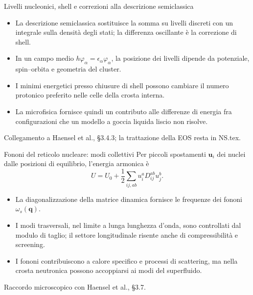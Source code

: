 \begin{frame}[t]{Livelli nucleonici, shell e correzioni alla descrizione semiclassica}
\vspace*{3mm}
\small
\begin{itemize}
\item La descrizione semiclassica sostituisce la somma su livelli discreti con un integrale sulla densità degli stati; la differenza oscillante è la correzione di shell.
\item In un campo medio $h\varphi_\alpha=\epsilon_\alpha\varphi_\alpha$, la posizione dei livelli dipende da potenziale, spin--orbita e geometria del cluster.
\item I minimi energetici presso chiusure di shell possono cambiare il numero protonico preferito nelle celle della crosta interna.
\item La microfisica fornisce quindi un contributo alle differenze di energia fra configurazioni che un modello a goccia liquida liscio non risolve.
\end{itemize}
{\footnotesize Collegamento a Haensel et al., §3.4.3; la trattazione della EOS resta in NS.tex.}
\end{frame}

\begin{frame}[t]{Fononi del reticolo nucleare: modi collettivi}
\vspace*{3mm}
\small
Per piccoli spostamenti $\mathbf u_i$ dei nuclei dalle posizioni di equilibrio, l'energia armonica è
\[
U=U_0+\frac12\sum_{ij,ab}u_i^a D_{ij}^{ab}u_j^b.
\]
\begin{itemize}
\item La diagonalizzazione della matrice dinamica fornisce le frequenze dei fononi $\omega_s(\mathbf q)$.
\item I modi trasversali, nel limite a lunga lunghezza d'onda, sono controllati dal modulo di taglio; il settore longitudinale risente anche di compressibilità e screening.
\item I fononi contribuiscono a calore specifico e processi di scattering, ma nella crosta neutronica possono accoppiarsi ai modi del superfluido.
\end{itemize}
{\footnotesize Raccordo microscopico con Haensel et al., §3.7.}
\end{frame}

